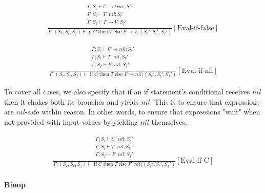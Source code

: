 \documentclass{scrartcl}
\DeclareMathOperator{\ifop}{if}
\DeclareMathOperator{\thenop}{then}
\DeclareMathOperator{\elseop}{else}
\DeclareMathOperator{\ceval}{\overset{C}{\rightarrow}}
\begin{document}
    \begin{align*}
    \frac{
        \begin{matrix}
        \Gamma; S_c \vdash C \rightarrow true; S_c' \\
        \Gamma; S_t \vdash T \ceval nil; S_t' \\
        \Gamma; S_f \vdash F \rightarrow V; S_f' \\
        \end{matrix}
    }{
        \Gamma; (S_c, S_t, S_f) \vdash \ifop C \thenop T \elseop F \rightarrow V; (S_c', S_t', S_f')
    }[\text{Eval-if-false}]
    \end{align*}
    
    \begin{align*}
    \frac{
        \begin{matrix}
        \Gamma; S_c \vdash C \rightarrow nil; S_c' \\
        \Gamma; S_t \vdash T \ceval nil; S_t' \\
        \Gamma; S_f \vdash F \ceval nil; S_f' \\
        \end{matrix}
    }{
        \Gamma; (S_c, S_t, S_f) \vdash \ifop C \thenop T \elseop F \rightarrow nil; (S_c', S_t', S_f')
    }[\text{Eval-if-nil}]
    \end{align*}
    
    To cover all cases, we also specify that if an if statement's conditional receives $nil$ then it chokes both its branches and yields $nil$. This is to ensure that expressions are $nil$-safe within reason. In other words, to ensure that expressions "wait" when not provided with input values by yielding $nil$ themselves.
    
    \begin{align*}
    \frac{
        \begin{matrix}
        \Gamma; S_c \vdash C \ceval nil; S_c' \\
        \Gamma; S_t \vdash T \ceval nil; S_t' \\
        \Gamma; S_f \vdash F \ceval nil; S_f' \\
        \end{matrix}
    }{
        \Gamma; (S_c, S_t, S_f) \vdash \ifop C \thenop T \elseop F \ceval nil; (S_c', S_t', S_f')
    }[\text{Eval-if-C}]
    \end{align*}
    
    \paragraph{Binop}
    
\end{document}
